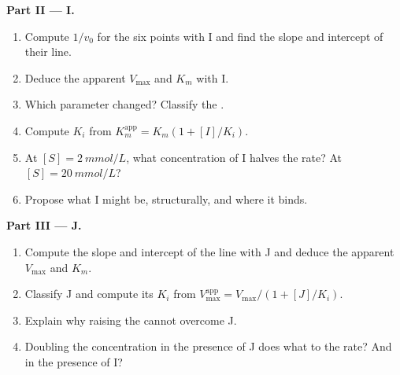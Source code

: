\begin{problem}
\medskip
\noindent\textbf{Part II ---  I.}
\begin{enumerate}[resume]
  \item Compute $1/v_0$ for the six points with I and find the slope
        and intercept of their line.
  \item Deduce the apparent $V_{\max}$ and $K_m$ with I.
  \item Which parameter changed? Classify the .
  \item Compute $K_i$ from $K_m^{\text{app}} = K_m(1 + [I]/K_i)$.
  \item At $[S] = \qty{2}{mmol/L}$, what concentration of I halves the
        rate? At $[S] = \qty{20}{mmol/L}$?
  \item Propose what I might be, structurally, and where it binds.
\end{enumerate}

\medskip
\noindent\textbf{Part III ---  J.}
\begin{enumerate}[resume]
  \item Compute the slope and intercept of the line with J and deduce
        the apparent $V_{\max}$ and $K_m$.
  \item Classify J and compute its $K_i$ from $V_{\max}^{\text{app}} =
        V_{\max}/(1 + [J]/K_i)$.
  \item Explain why raising the  cannot overcome J.
  \item Doubling the  concentration in the presence of J does
        what to the rate? And in the presence of I?
\end{enumerate}


\end{problem}
